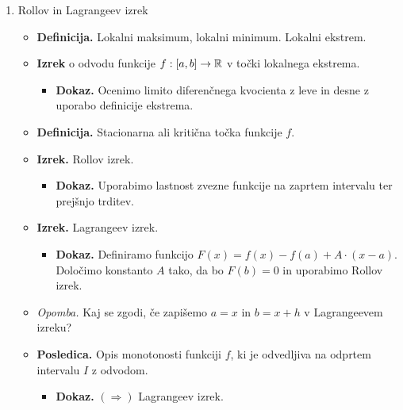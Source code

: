 \begin{enumerate}
    \item Rollov in Lagrangeev izrek
    \begin{itemize}
        \item \colorbox{purple!30}{\textbf{Definicija.}} Lokalni maksimum, lokalni minimum. Lokalni ekstrem.        
        \item \colorbox{blue!30}{\textbf{Izrek}} o odvodu funkcije $f: [a,b] \to \mathbb{R}$ v točki lokalnega ekstrema.
        \begin{itemize}
            \item \colorbox{green!30}{\textbf{Dokaz.}} Ocenimo limito diferenčnega kvocienta z leve in desne z uporabo definicije ekstrema.
        \end{itemize}
        \item \colorbox{purple!30}{\textbf{Definicija.}} Stacionarna ali kritična točka funkcije $f$.
        \item \colorbox{blue!30}{\textbf{Izrek.}} Rollov izrek.
        \begin{itemize}
            \item \colorbox{green!30}{\textbf{Dokaz.}} Uporabimo lastnost zvezne funkcije na zaprtem intervalu ter prejšnjo trditev.
        \end{itemize}
        \item \colorbox{blue!30}{\textbf{Izrek.}} Lagrangeev izrek.
        \begin{itemize}
            \item \colorbox{green!30}{\textbf{Dokaz.}} Definiramo funkcijo $F(x) = f(x) - f(a) + A \cdot (x-a)$. Določimo konstanto $A$ tako, da bo $F(b) = 0$ in uporabimo Rollov izrek.
        \end{itemize}
        \item \colorbox{yellow!30}{\emph{Opomba.}} Kaj se zgodi, če zapišemo $a = x$ in $b=x+h$ v Lagrangeevem izreku?
        \item \colorbox{orange!30}{\textbf{Posledica.}} Opis monotonosti funkciji $f$, ki je odvedljiva na odprtem intervalu $I$ z odvodom.
        \begin{itemize}
            \item \colorbox{green!30}{\textbf{Dokaz.}} $(\Rightarrow)$ Lagrangeev izrek.        
            

\end{itemize}
\end{itemize}
\end{enumerate}
